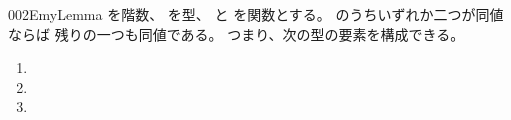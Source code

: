 \documentclass[index]{subfiles}
\begin{document}
\begin{myBlock}{002E}{myLemma}
  を階数、
  を型、
  と
  を関数とする。
  のうちいずれか二つが同値ならば
  残りの一つも同値である。
  つまり、次の型の要素を構成できる。
  \begin{enumerate}
  \item {}
  \item {}
  \item {}
  \end{enumerate}
\end{myBlock}
\end{document}
